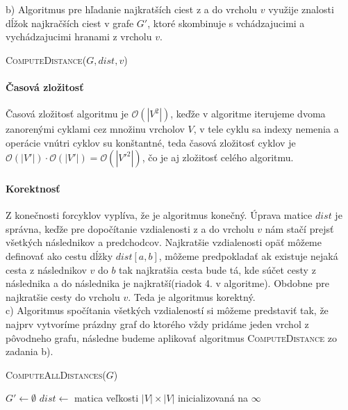 \documentclass[12pt]{iv003}
\begin{document}
b) Algoritmus pre hľadanie najkratších ciest z a do vrcholu $v$ využije znalosti dĺžok najkračších ciest v grafe $G'$, ktoré skombinuje s vchádzajucimi a vychádzajucimi hranami z vrcholu $v$.

\begin{algorithm}[H]
	\caption{\textsc{ComputeDistance}($G, dist, v$)}
	
\end{algorithm}

\paragraph{Časová zložitosť}
Časová zložitosť algoritmu je $\mathcal{O}(|V^{2}|)$, keďže v algoritme iterujeme dvoma zanorenými cyklami cez množinu vrcholov $V$, v tele cyklu sa indexy nemenia a operácie vnútri cyklov su konštantné, teda časová zložitosť cyklov je $\mathcal{O}(|V'|) \cdot \mathcal{O}(|V'|) = \mathcal{O}(|V'^{2}|)$, čo je aj zložitosť celého algoritmu.

\paragraph{Korektnosť}
Z konečnosti forcyklov vyplíva, že je algoritmus konečný. Úprava matice $dist$ je správna, keďže pre dopočítanie vzdialenosti z a do vrcholu $v$ nám stačí prejsť všetkých následnikov a predchodcov. Najkratšie vzdialenosti opäť môžeme definovať
ako cestu dĺžky $dist[a,b]$, môžeme predpokladať ak existuje nejaká cesta z následnikov $v$ do $b$ tak najkratšia cesta bude tá, kde súčet cesty z následnika a do následnika je najkratší(riadok 4. v algoritme). Obdobne pre najkratšie cesty do vrcholu $v$. Teda je algoritmus korektný.\\

c) Algoritmus spočítania všetkých vzdialeností si môžeme predstaviť tak, že najprv vytvoríme prázdny graf do ktorého vždy pridáme jeden vrchol z pôvodneho grafu, následne budeme aplikovať algoritmus \textsc{ComputeDistance} zo zadania b).

\begin{algorithm}[H]
	\caption{\textsc{ComputeAllDistances}($G$)}
	$G' \leftarrow \emptyset$
	$dist \leftarrow$ matica veľkosti $|V| \times |V|$ inicializovaná na $\infty$\;
\end{algorithm}
\end{document}
